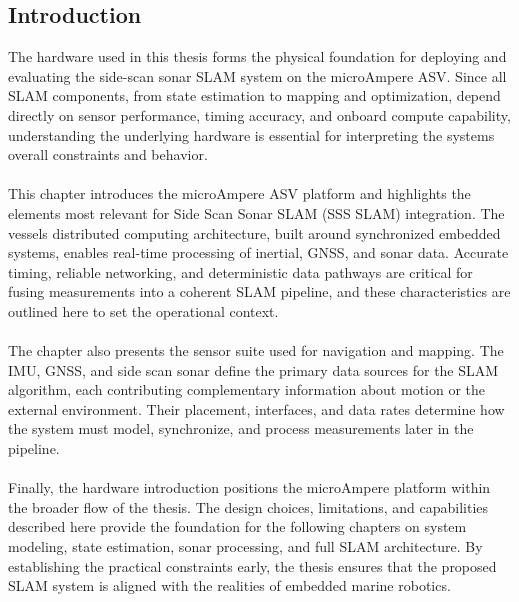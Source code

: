 \subsection{Introduction}
The hardware used in this thesis forms the physical foundation for deploying and evaluating the side-scan sonar SLAM system on the microAmpere ASV. Since all SLAM components, from state estimation to mapping and optimization, depend directly on sensor performance, timing accuracy, and onboard compute capability, understanding the underlying hardware is essential for interpreting the systems overall constraints and behavior.
\\ \\
This chapter introduces the microAmpere ASV platform and highlights the elements most relevant for Side Scan Sonar SLAM (SSS SLAM) integration. The vessels distributed computing architecture, built around synchronized embedded systems, enables real-time processing of inertial, GNSS, and sonar data. Accurate timing, reliable networking, and deterministic data pathways are critical for fusing measurements into a coherent SLAM pipeline, and these characteristics are outlined here to set the operational context.
\\ \\
The chapter also presents the sensor suite used for navigation and mapping. The IMU, GNSS, and side scan sonar define the primary data sources for the SLAM algorithm, each contributing complementary information about motion or the external environment. Their placement, interfaces, and data rates determine how the system must model, synchronize, and process measurements later in the pipeline.
\\ \\
Finally, the hardware introduction positions the microAmpere platform within the broader flow of the thesis. The design choices, limitations, and capabilities described here provide the foundation for the following chapters on system modeling, state estimation, sonar processing, and full SLAM architecture. By establishing the practical constraints early, the thesis ensures that the proposed SLAM system is aligned with the realities of embedded marine robotics.

